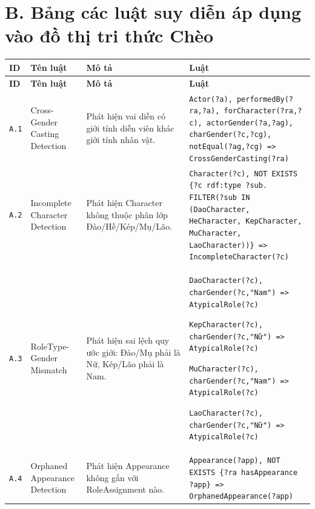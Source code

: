 %

\section*{B. Bảng các luật suy diễn áp dụng vào đồ thị tri thức Chèo}
\label{appendix:inference_rules}

\begin{longtable}{|p{0.9cm}|p{3.0cm}|p{4.0cm}|p{6.4cm}|}
  \hline
  \textbf{ID} & \textbf{Tên luật} & \textbf{Mô tả} & \textbf{Luật} \\
  \hline
  \endfirsthead
  \hline
  \textbf{ID} & \textbf{Tên luật} & \textbf{Mô tả} & \textbf{Luật} \\
  \hline
  \endhead
  \hline
  \endfoot
  \hline
  \endlastfoot

  \texttt{A.1}
  & Cross-Gender Casting Detection
  & Phát hiện vai diễn có giới tính diễn viên khác giới tính nhân vật.
  & \texttt{Actor(?a), performedBy(?ra,?a),
    forCharacter(?ra,?c), actorGender(?a,?ag),
    charGender(?c,?cg), notEqual(?ag,?cg)
    => CrossGenderCasting(?ra)} \\
  \hline

  \texttt{A.2}
  & Incomplete Character Detection
  & Phát hiện Character không thuộc phân lớp Đào/Hề/Kép/Mụ/Lão.
  & \texttt{Character(?c), NOT EXISTS \{?c rdf:type ?sub.
    FILTER(?sub IN (DaoCharacter, HeCharacter, KepCharacter,
    MuCharacter, LaoCharacter))\}
    => IncompleteCharacter(?c)} \\
  \hline

  \texttt{A.3}
  & RoleType-Gender Mismatch
  & Phát hiện sai lệch quy ước giới: Đào/Mụ phải là Nữ, Kép/Lão phải là Nam.
  & \texttt{DaoCharacter(?c), charGender(?c,"Nam") => AtypicalRole(?c)}\par
    \texttt{KepCharacter(?c), charGender(?c,"Nữ") => AtypicalRole(?c)}\par
    \texttt{MuCharacter(?c), charGender(?c,"Nam") => AtypicalRole(?c)}\par
    \texttt{LaoCharacter(?c), charGender(?c,"Nữ") => AtypicalRole(?c)} \\
  \hline

  \texttt{A.4}
  & Orphaned Appearance Detection
  & Phát hiện Appearance không gắn với RoleAssignment nào.
  & \texttt{Appearance(?app), NOT EXISTS \{?ra hasAppearance ?app\}
    => OrphanedAppearance(?app)} \\
  \hline


\end{longtable}
